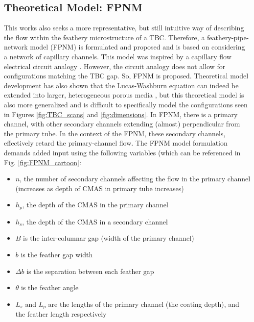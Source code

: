 \documentclass{UCF_ETD}
\begin{document}
\subsection{Theoretical Model: FPNM}
\label{sec:pipeNetworkMethod}
This works also seeks a more representative, but still intuitive way of describing the flow within the feathery microstructure of a TBC. Therefore, a feathery-pipe-network model (FPNM)  is formulated and proposed and is based on considering a network of capillary channels. This model was inspired by a capillary flow electrical circuit analogy \cite{Mikaelian2020}. However, the circuit analogy does not allow for configurations matching the TBC gap. So, FPNM is proposed. Theoretical model development has also shown that the Lucas-Washburn equation can indeed be extended into larger, heterogeneous porous media \cite{Cai2021, WAGHMARE2010561}, but this theoretical model is also more generalized and is difficult to specifically model the configurations seen in Figures \ref{fig:TBC_scans} and \ref{fig:dimensions}.
In FPNM, there is a primary channel, with other secondary channels extending (almost) perpendicular from the primary tube. In the context of the FPNM, these secondary channels, effectively retard the primary-channel flow. The FPNM model formulation demands added input using the following variables (which can be referenced in Fig. \ref{fig:FPNM_cartoon}:

\begin{itemize}
    \item $n$, the number of secondary channels affecting the flow in the primary channel (increases as depth of CMAS in primary tube increases)
    \item $h_{p}$, the depth of the CMAS in the primary channel
    \item $h_{s}$, the depth of the CMAS in a secondary channel
    \item $B$ is the inter-columnar gap (width of the primary channel)
    \item $b$ is the feather gap width
    \item $\Delta b$ is the separation between each feather gap
    \item $\theta$ is the feather angle
    \item $L_{s}$ and $L_{p}$ are the lengths of the primary channel (the coating depth), and the feather length respectively
\end{itemize}
\end{document}

